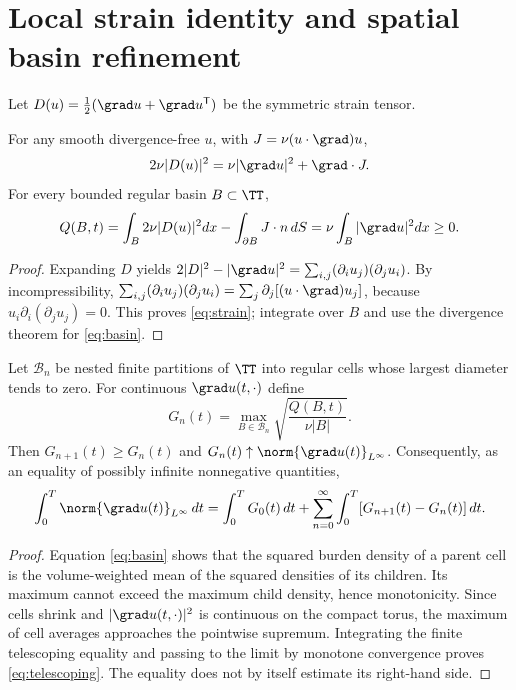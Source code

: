\section{Local strain identity and spatial basin refinement}
Let $D(u)=\tfrac12(\grad u+\grad u^{\mathsf T})$ be the symmetric strain tensor.
\begin{proposition}\label{prop:strain}
For any smooth divergence-free $u$, with $J=\nu(u\cdot\grad)u$,
\begin{equation}\label{eq:strain}
2\nu|D(u)|^2=\nu|\grad u|^2+\grad\cdot J.
\end{equation}
For every bounded regular basin $B\subset\TT$,
\begin{equation}\label{eq:basin}
Q(B,t)=\int_B2\nu|D(u)|^2dx-\int_{\partial B}J\cdot n\,dS
=\nu\int_B|\grad u|^2dx\ge0.
\end{equation}
\end{proposition}
\begin{proof}
Expanding $D$ yields
$2|D|^2-|\grad u|^2=\sum_{i,j}(\partial_i u_j)(\partial_j u_i)$.
By incompressibility,
$\sum_{i,j}(\partial_i u_j)(\partial_j u_i)=\sum_j\partial_j[(u\cdot\grad)u_j]$,
because $u_i\partial_i(\partial_j u_j)=0$. This proves \eqref{eq:strain}; integrate over $B$ and use the divergence theorem for \eqref{eq:basin}.
\end{proof}
\begin{proposition}\label{prop:partition}
Let $\mathcal B_n$ be nested finite partitions of $\TT$ into regular cells whose largest diameter tends to zero. For continuous $\grad u(t,\cdot)$ define
\[
G_n(t)=\max_{B\in\mathcal B_n}\sqrt{\frac{Q(B,t)}{\nu |B|}}.
\]
Then $G_{n+1}(t)\ge G_n(t)$ and $G_n(t)\uparrow\norm{\grad u(t)}_{L^\infty}$. Consequently, as an equality of possibly infinite nonnegative quantities,
\begin{equation}\label{eq:telescoping}
\int_0^T\norm{\grad u(t)}_{L^\infty}\,dt
=\int_0^TG_0(t)\,dt+\sum_{n=0}^\infty\int_0^T[G_{n+1}(t)-G_n(t)]\,dt.
\end{equation}
\end{proposition}
\begin{proof}
Equation \eqref{eq:basin} shows that the squared burden density of a parent cell is the volume-weighted mean of the squared densities of its children. Its maximum cannot exceed the maximum child density, hence monotonicity. Since cells shrink and $|\grad u(t,\cdot)|^2$ is continuous on the compact torus, the maximum of cell averages approaches the pointwise supremum. Integrating the finite telescoping equality and passing to the limit by monotone convergence proves \eqref{eq:telescoping}. The equality does not by itself estimate its right-hand side.
\end{proof}

